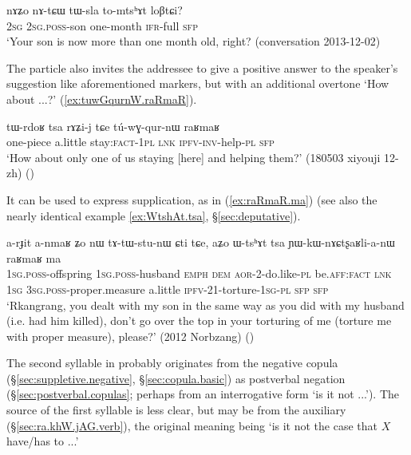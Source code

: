  \begin{exe}
\ex \label{ex:tWsla.tomtshAt.loBtCi}
\gll  nɤʑo nɤ-tɕɯ tɯ-sla to-mtsʰɤt loβtɕi? \\
\textsc{2sg} \textsc{2sg}.\textsc{poss}-son one-month \textsc{ifr}-full \textsc{sfp} \\
\glt `Your son is now more than one month old, right? (conversation 2013-12-02)
  \end{exe}
 
The particle  also invites the addressee to give a positive answer to the speaker's suggestion like aforementioned markers, but with an additional overtone `How about ...?' (\ref{ex:tuwGqurnW.raRmaR}).

 \begin{exe}
\ex \label{ex:tuwGqurnW.raRmaR}
\gll  tɯ-rdoʁ tsa rɤʑi-j tɕe tú-wɣ-qur-nɯ raʁmaʁ \\
one-piece a.little stay:\textsc{fact}-\textsc{1pl} \textsc{lnk} \textsc{ipfv}-\textsc{inv}-help-\textsc{pl} \textsc{sfp} \\
\glt  `How about only one of us staying [here] and helping them?'  (180503 xiyouji 12-zh)
()
  \end{exe}
 
It can be used to express supplication, as in  (\ref{ex:raRmaR.ma}) (see also the nearly identical example \ref{ex:WtshAt.tsa}, §\ref{sec:deputative}).

 \begin{exe}
\ex \label{ex:raRmaR.ma}
\gll  a-rɟit a-nmaʁ ʑo nɯ tɤ-tɯ-stu-nɯ ɕti tɕe, aʑo ɯ-tsʰɤt tsa ɲɯ-kɯ-nɤɕtʂaʁli-a-nɯ raʁmaʁ ma \\
\textsc{1sg}.\textsc{poss}-offspring \textsc{1sg}.\textsc{poss}-husband \textsc{emph} \textsc{dem} \textsc{aor}-2-do.like-\textsc{pl} be.\textsc{aff}:\textsc{fact} \textsc{lnk}  \textsc{1sg} \textsc{3sg}.\textsc{poss}-proper.measure a.little \textsc{ipfv}-2\fl{}1-torture-\textsc{1sg}-\textsc{pl} \textsc{sfp} \textsc{sfp}  \\ 
\glt `Rkangrang, you dealt with my son in the same way as you did with my husband (i.e. had him killed), don't go over the top in your torturing of me (torture me with proper measure), please?' (2012 Norbzang) 	()
  \end{exe}
 
 The second syllable  in   probably originates from the negative copula  (§\ref{sec:suppletive.negative}, §\ref{sec:copula.basic}) as postverbal negation (§\ref{sec:postverbal.copulas}; perhaps from an interrogative form  `is it not ...'). The source of the first syllable  is less clear, but may be from the auxiliary  (§\ref{sec:ra.khW.jAG.verb}), the original meaning being `is it not the case that $X$ have/has to ...'
  
